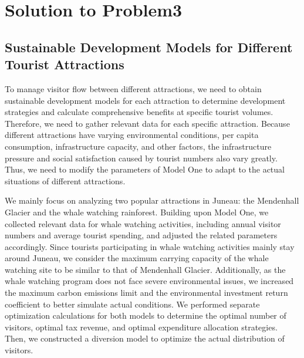\documentclass[12pt]{article}  %
\begin{document}
\section{Solution to Problem3}
\subsection{Sustainable Development Models for Different Tourist Attractions}
To manage visitor flow between different attractions, we need to obtain sustainable development models for each attraction to determine development strategies and calculate comprehensive benefits at specific tourist volumes. Therefore, we need to gather relevant data for each specific attraction. Because different attractions have varying environmental conditions, per capita consumption, infrastructure capacity, and other factors, the infrastructure pressure and social satisfaction caused by tourist numbers also vary greatly. Thus, we need to modify the parameters of Model One to adapt to the actual situations of different attractions.

We mainly focus on analyzing two popular attractions in Juneau: the Mendenhall Glacier and the whale watching rainforest. Building upon Model One, we collected relevant data for whale watching activities, including annual visitor numbers and average tourist spending,\cite{11} and adjusted the related parameters accordingly. Since tourists participating in whale watching activities mainly stay around Juneau, we consider the maximum carrying capacity of the whale watching site to be similar to that of Mendenhall Glacier. Additionally, as the whale watching program does not face severe environmental issues, we increased the maximum carbon emissions limit and the environmental investment return coefficient to better simulate actual conditions.
We performed separate optimization calculations for both models to determine the optimal number of visitors, optimal tax revenue, and optimal expenditure allocation strategies. Then, we constructed a diversion model to optimize the actual distribution of visitors.
\end{document}
